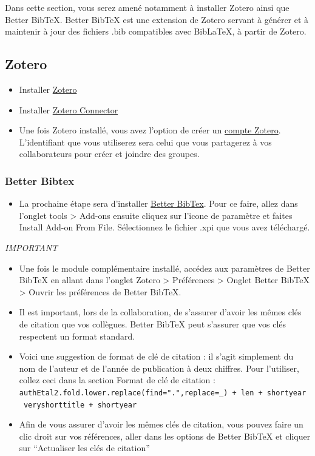 \documentclass[
  letterpaper,
  DIV=11,
  numbers=noendperiod]{scrreprt}
\providecommand{\tightlist}{%
  \setlength{\itemsep}{0pt}\setlength{\parskip}{0pt}}\usepackage{longtable,booktabs,array}
\begin{document}
Dans cette section, vous serez amené notamment à installer Zotero ainsi
que Better BibTeX. Better BibTeX est une extension de Zotero servant à
générer et à maintenir à jour des fichiers .bib compatibles avec
BibLaTeX, à partir de Zotero.

\subsection{Zotero}\label{zotero}

\begin{itemize}
\item
  Installer \href{https://www.zotero.org/download/}{Zotero}
\item
  Installer \href{https://www.zotero.org/download/}{Zotero Connector}
\item
  Une fois Zotero installé, vous avez l'option de créer un
  \href{https://www.zotero.org/user/register/}{compte Zotero}.
  L'identifiant que vous utiliserez sera celui que vous partagerez à vos
  collaborateurs pour créer et joindre des groupes.
\end{itemize}

\subsubsection{Better Bibtex}\label{better-bibtex}

\begin{itemize}
\tightlist
\item
  La prochaine étape sera d'installer
  \href{https://retorque.re/zotero-better-bibtex/installation/}{Better
  BibTex}. Pour ce faire, allez dans l'onglet tools \textgreater{}
  Add-ons ensuite cliquez sur l'icone de paramètre et faites Install
  Add-on From File. Sélectionnez le fichier .xpi que vous avez
  téléchargé.
\end{itemize}

\emph{IMPORTANT}

\begin{itemize}
\item
  Une fois le module complémentaire installé, accédez aux paramètres de
  Better BibTeX en allant dans l'onglet Zotero \textgreater{}
  Préférences \textgreater{} Onglet Better BibTeX \textgreater{} Ouvrir
  les préférences de Better BibTeX.
\item
  Il est important, lors de la collaboration, de s'assurer d'avoir les
  mêmes clés de citation que vos collègues. Better BibTeX peut s'assurer
  que vos clés respectent un format standard.
\item
  Voici une suggestion de format de clé de citation : il s'agit
  simplement du nom de l'auteur et de l'année de publication à deux
  chiffres. Pour l'utiliser, collez ceci dans la section Format de clé
  de citation :
  \texttt{authEtal2.fold.lower.replace(find=".",replace=\_)\ +\ len\ +\ shortyear\ \textbar{}\ veryshorttitle\ +\ shortyear}
\item
  Afin de vous assurer d'avoir les mêmes clés de citation, vous pouvez
  faire un clic droit sur vos références, aller dans les options de
  Better BibTeX et cliquer sur ``Actualiser les clés de citation''
\end{itemize}
\end{document}
